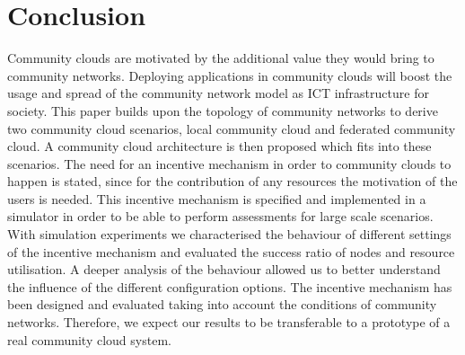 

\section{Conclusion}
\label{sec:conclusion}

Community clouds are motivated by the additional value they would bring to community networks. 
Deploying applications in community clouds will boost the usage and spread of the community network model as ICT infrastructure for society. 
This paper builds upon the topology of community networks to derive two community cloud scenarios, local community cloud and federated community cloud. 
A community cloud architecture is then proposed which fits into these scenarios. 
The need for an incentive mechanism in order to community clouds to happen is stated, since for the contribution of any resources the motivation of the users is needed. 
This incentive mechanism is specified and implemented in a simulator in order to be able to perform assessments for large scale scenarios. 
With simulation experiments we characterised the behaviour of different settings of the incentive mechanism and evaluated the success ratio of nodes and resource utilisation. 
A deeper analysis of the behaviour allowed us to better understand the influence of the different configuration options. 
The incentive mechanism has been designed and evaluated taking into account the conditions of community networks. 
Therefore, we expect our results to be transferable to a prototype of a real community cloud system.
 
 